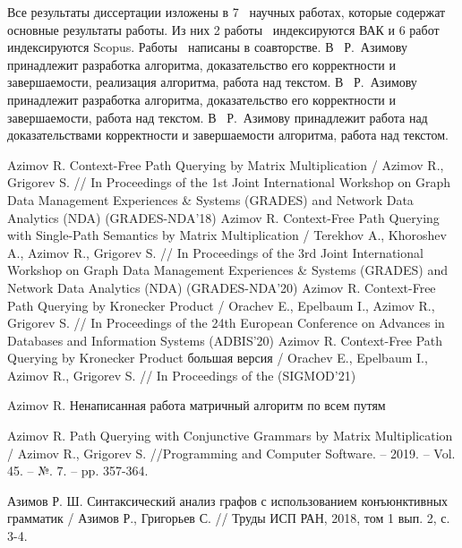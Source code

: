 
{\publications} Все результаты диссертации изложены в 7~\cite{1,2,3,4,5,6,7} научных работах, которые содержат основные результаты работы. Из них 2 работы~\cite{6,7} индексируются ВАК и 6 работ~\cite{1,2,3,4,5,6} индексируются Scopus. Работы~\cite{1,2,3,4,6,7} написаны в соавторстве. В~\cite{1,6,7} Р.~Азимову принадлежит разработка алгоритма, доказательство его корректности и завершаемости, реализация алгоритма, работа над текстом. В~\cite{2} Р.~Азимову принадлежит разработка алгоритма, доказательство его корректности и завершаемости, работа над текстом. В~\cite{3,4} Р.~Азимову принадлежит работа над доказательствами корректности и завершаемости алгоритма, работа над текстом.


\begin{thebibliography}{99}
	 Azimov R. Context-Free Path Querying by
	Matrix Multiplication / Azimov R., Grigorev S. // In Proceedings of the
	1st Joint International Workshop on Graph Data Management Experiences \&
	Systems (GRADES) and Network Data Analytics (NDA) (GRADES-NDA’18)
	 Azimov R. Context-Free Path Querying with Single-Path Semantics by
	Matrix Multiplication / Terekhov A., Khoroshev A., Azimov R., Grigorev S. // In Proceedings of the
	3rd Joint International Workshop on Graph Data Management Experiences \&
	Systems (GRADES) and Network Data Analytics (NDA) (GRADES-NDA’20)
	 Azimov R. Context-Free Path Querying by Kronecker
	Product / Orachev E., Epelbaum I., Azimov R., Grigorev S. // In Proceedings of the
	24th European Conference on Advances in Databases and Information Systems (ADBIS’20)
	 Azimov R. Context-Free Path Querying by Kronecker
	Product большая версия / Orachev E., Epelbaum I., Azimov R., Grigorev S. // In Proceedings of the (SIGMOD’21)
	
	 Azimov R. Ненаписанная работа матричный алгоритм по всем путям
	
	 Azimov R. Path Querying with Conjunctive Grammars by Matrix Multiplication / Azimov R., Grigorev S. //Programming and Computer Software. – 2019. – Vol. 45. – №. 7. – pp. 357-364.
	\setcounter{firstbib}{\value{enumiv}}
	
	 Азимов Р. Ш. Синтаксический анализ графов с использованием конъюнктивных грамматик / Азимов Р., Григорьев С. // Труды ИСП РАН, 2018, том 1 вып. 2, с. 3-4.
	
\end{thebibliography}